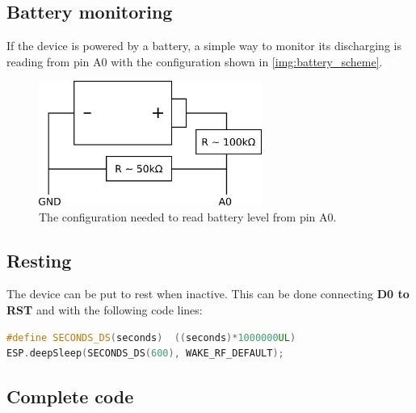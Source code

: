 \subsection{Battery monitoring}
If the device is powered by a battery, a simple way to monitor its discharging is reading from pin A0 with the configuration shown in \autoref{img:battery_scheme}.

\begin{figure}[!htb] 
  \centering
  \includegraphics[width=0.65\textwidth]{latex/img/battery_scheme.png}
  \caption{The configuration needed to read battery level from pin A0.}\label{img:battery_scheme}
\end{figure}

\subsection{Resting}
The device can be put to rest when inactive. This can be done connecting \textbf{D0 to RST} and with the following code lines:
\begin{lstlisting}[language=C++]
#define SECONDS_DS(seconds)  ((seconds)*1000000UL)
ESP.deepSleep(SECONDS_DS(600), WAKE_RF_DEFAULT);  
\end{lstlisting}


\subsection{Complete code}

